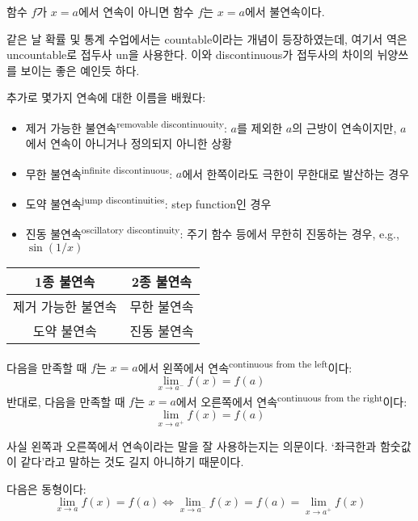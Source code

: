 \documentclass[../note.tex]{subfiles}
\begin{document}
\begin{definition}[불연속]
  함수 $f$가 $x=a$에서 연속이 아니면 함수 $f$는 $x=a$에서 불연속이다.
\end{definition}
같은 날 확률 및 통계 수업에서는 countable이라는 개념이 등장하였는데, 여기서 역은 uncountable로 접두사 un을 사용한다. 이와 discontinuous가 접두사의 차이의 뉘양쓰를 보이는 좋은 예인듯 하다.

\begin{remark}
  추가로 몇가지 연속에 대한 이름을 배웠다:
  \begin{itemize}
    \item
      제거 가능한 불연속\textsuperscript{removable discontinuouity}: $a$를 제외한 $a$의 근방이 연속이지만, $a$에서 연속이 아니거나 정의되지 아니한 상황
    \item
      무한 불연속\textsuperscript{infinite discontinuous}: $a$에서 한쪽이라도 극한이 무한대로 발산하는 경우
    \item
      도약 불연속\textsuperscript{jump discontinuities}: step function인 경우
    \item
      진동 불연속\textsuperscript{oscillatory discontinuity}: 주기 함수 등에서 무한히 진동하는 경우, e.g., $\sin(1/x)$
  \end{itemize}
  \begin{table}
    \centering
    \begin{tabular}{|c|c|}
      \hline
      1종 불연속 & 2종 불연속 \\
      \hline
      제거 가능한 불연속 & 무한 불연속 \\
      도약 불연속 & 진동 불연속 \\
      \hline
    \end{tabular}
  \end{table}
\end{remark}

\begin{definition}[왼-오른쪽에서 연속]
  다음을 만족할 때 $f$는 $x=a$에서 왼쪽에서 연속\textsuperscript{continuous from the left}이다:
  \begin{equation}
    \lim_{x \to a^-} f(x) = f(a)
  \end{equation}
  반대로, 다음을 만족할 때 $f$는 $x=a$에서 오른쪽에서 연속\textsuperscript{continuous from the right}이다:
  \begin{equation}
    \lim_{x \to a^+} f(x) = f(a)
  \end{equation}
\end{definition}
사실 왼쪽과 오른쪽에서 연속이라는 말을 잘 사용하는지는 의문이다. `좌극한과 함숫값이 같다'라고 말하는 것도 길지 아니하기 때문이다.
\begin{theorem}
  다음은 동형이다:
  \begin{equation}
    \lim_{x \to a} f(x) = f(a) \Longleftrightarrow \lim_{x \to a^-} f(x) = f(a) = \lim_{x \to a^+} f(x)
  \end{equation}
\end{theorem}
\end{document}
